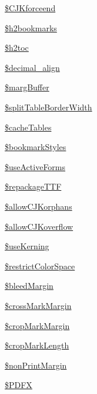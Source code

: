 \begin{DoxyCompactItemize}
\item 
\hyperlink{classm_p_d_f_a81bb480acd714f9425f4bb036f9cd47b}{\$\-C\-J\-Kforceend}
\item 
\hyperlink{classm_p_d_f_a3d6bc3f5c67c54437ffa55f414e091a3}{\$h2bookmarks}
\item 
\hyperlink{classm_p_d_f_aa306a75eb91ab0aba8256c7d28a76313}{\$h2toc}
\item 
\hyperlink{classm_p_d_f_a6c49d58f42d4b66f6e4b2d0bb4d7aad7}{\$decimal\-\_\-align}
\item 
\hyperlink{classm_p_d_f_a6041f9858fed7cf63985941f60aee26f}{\$marg\-Buffer}
\item 
\hyperlink{classm_p_d_f_a8ecd4403daa1ea02e1ea0f2bb44ebf23}{\$split\-Table\-Border\-Width}
\item 
\hyperlink{classm_p_d_f_a9772ecac0ffad6d90e0c3cb2576c2b9a}{\$cache\-Tables}
\item 
\hyperlink{classm_p_d_f_a6d5a12f0aeb149a1b66efda90279a81f}{\$bookmark\-Styles}
\item 
\hyperlink{classm_p_d_f_a7ea610858f89932f0ed5c359aebda0a4}{\$use\-Active\-Forms}
\item 
\hyperlink{classm_p_d_f_a5b019effaf4f8838a37dbe4fa3d7d4aa}{\$repackage\-T\-T\-F}
\item 
\hyperlink{classm_p_d_f_a2ffe0c1b5af4f1a3dfe1ed166996537f}{\$allow\-C\-J\-Korphans}
\item 
\hyperlink{classm_p_d_f_a895d2fb1060a1daa2126aa182d2605ab}{\$allow\-C\-J\-Koverflow}
\item 
\hyperlink{classm_p_d_f_a58d543901dd91e4ca74a77a894d799c4}{\$use\-Kerning}
\item 
\hyperlink{classm_p_d_f_a751b9bd1b55f98ed955101a8d3879953}{\$restrict\-Color\-Space}
\item 
\hyperlink{classm_p_d_f_a22b445f6e0e579ba7237b12ffcc71a74}{\$bleed\-Margin}
\item 
\hyperlink{classm_p_d_f_acb2567dec101768890eceed784d47560}{\$cross\-Mark\-Margin}
\item 
\hyperlink{classm_p_d_f_a512a8f96ac434661bd22179ecef1265f}{\$crop\-Mark\-Margin}
\item 
\hyperlink{classm_p_d_f_ad8994d84ba6b47a98774e70d0489ab28}{\$crop\-Mark\-Length}
\item 
\hyperlink{classm_p_d_f_a96c920e7a9ea8729afd34a5e57d3c997}{\$non\-Print\-Margin}
\item 
\hyperlink{classm_p_d_f_a5fb2a2cf0840146efe5d546c5a0b1bbc}{\$\-P\-D\-F\-X}
\item 

\end{DoxyCompactItemize}
